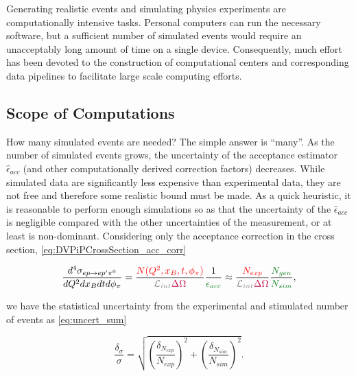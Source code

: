 Generating realistic \dvpip events and simulating physics experiments are computationally intensive tasks. Personal computers can run the necessary software, but a sufficient number of simulated events would require an unacceptably long amount of time on a single device. Consequently, much effort has been devoted to the construction of computational centers and corresponding data pipelines to facilitate large scale computing efforts. 

\subsection{Scope of Computations}

    How many simulated events are needed? The simple answer is ``many''. As the number of simulated events grows, the uncertainty of the acceptance estimator $\hat{\epsilon}_{acc}$ (and other computationally derived correction factors) decreases. While simulated data are significantly less expensive than experimental data, they are not free and therefore some realistic bound must be made. As a quick heuristic, it is reasonable to perform enough simulations so as that the uncertainty of the $\hat{\epsilon}_{acc}$ is negligible compared with the other uncertainties of the measurement, or at least is non-dominant. Considering only the acceptance correction in the cross section, \eqref{eq:DVPiPCrossSection_acc_corr}

    
     \begin{equation}\labelAndRemember{eq:DVPiPCrossSection_acc_corr}
           { \frac{    d^4\sigma_{  ep \rightarrow ep'\pi^0}   } {dQ^2dx_Bdtd\phi_{\pi}} 
                =   \frac{ \textcolor{red}{ N(Q^2,x_B,t,\phi_{\pi})}} {\Lumiint \textcolor{purple}{ \Delta \Omega}}
                \frac{1}{\textcolor{correctionfactors}{\epsilon_{acc}}} \approx \frac{ \textcolor{red}{ N_{exp} }} {\Lumiint \textcolor{purple}{ \Delta \Omega}}  \frac{\textcolor{correctionfactors}{N_{gen}}}{\textcolor{correctionfactors}{N_{sim}}}},
     \end{equation}     

     we have the statistical uncertainty from the experimental and stimulated number of events as \eqref{eq:uncert_sum}

    \begin{equation}\label{eq:uncert_sum}
               { 
               \frac{\delta_{\sigma}}{\sigma} = \sqrt{
                \left(\frac{\delta_{N_{exp}}}{N_{exp}} \right)^2+
                \left(\frac{\delta_{N_{sim}}}{N_{sim}} \right)^2 }               }.
         \end{equation}

